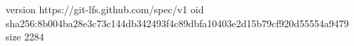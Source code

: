 version https://git-lfs.github.com/spec/v1
oid sha256:8b004ba28e3c73c144db342493f4c89dbfa10403e2d15b79cf920d55554a9479
size 2284
